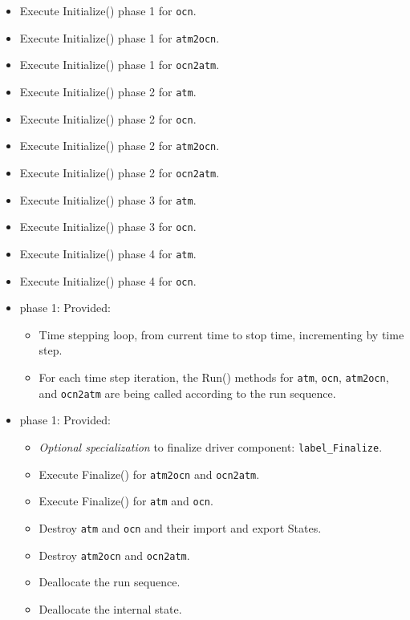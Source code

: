 \begin{itemize}
\begin{itemize}
  \item Execute Initialize() phase 1 for {\tt ocn}.
  \item Execute Initialize() phase 1 for {\tt atm2ocn}.
  \item Execute Initialize() phase 1 for {\tt ocn2atm}.
  \item Execute Initialize() phase 2 for {\tt atm}.
  \item Execute Initialize() phase 2 for {\tt ocn}.
  \item Execute Initialize() phase 2 for {\tt atm2ocn}.
  \item Execute Initialize() phase 2 for {\tt ocn2atm}.
  \item Execute Initialize() phase 3 for {\tt atm}.
  \item Execute Initialize() phase 3 for {\tt ocn}.
  \item Execute Initialize() phase 4 for {\tt atm}.
  \item Execute Initialize() phase 4 for {\tt ocn}.
  \end{itemize}  
\end{itemize}

\begin{itemize}
\item phase 1: {\sc Provided:}
  \begin{itemize}
  \item Time stepping loop, from current time to stop time, incrementing by time step.
  \item For each time step iteration, the Run() methods for {\tt atm}, {\tt ocn}, {\tt atm2ocn}, and {\tt ocn2atm} are being called according to the run sequence.
  \end{itemize}    
\end{itemize}

\begin{itemize}
\item phase 1: {\sc Provided:}
  \begin{itemize}
  \item {\it Optional specialization} to finalize driver component: {\tt label\_Finalize}.
  \item Execute Finalize() for {\tt atm2ocn} and {\tt ocn2atm}.
  \item Execute Finalize() for {\tt atm} and {\tt ocn}.
  \item Destroy {\tt atm} and {\tt ocn} and their import and export States.
  \item Destroy {\tt atm2ocn} and {\tt ocn2atm}.
  \item Deallocate the run sequence.
  \item Deallocate the internal state.
  \end{itemize}      
\end{itemize}

